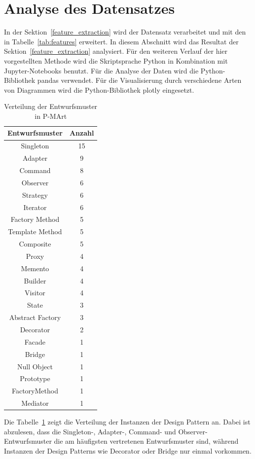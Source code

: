 \section{Analyse des Datensatzes}\label{dataset_analysis}

In der Sektion~\ref{feature_extraction} wird der Datensatz verarbeitet und mit den in Tabelle~\ref{tab:features} erweitert.
In diesem Abschnitt wird das Resultat der Sektion~\ref{feature_extraction} analysiert.
Für den weiteren Verlauf der hier vorgestellten Methode wird die Skriptsprache Python in Kombination mit Jupyter-Notebooks benutzt. Für die Analyse der Daten wird die Python-Bibliothek pandas verwendet. Für die Visualisierung durch verschiedene Arten von Diagrammen wird die Python-Bibliothek plotly eingesetzt.


\begin{table}[h]
    \begin{tabular}{|c|c|}
        \hline
        Entwurfsmuster & Anzahl\\
        \hline
        Singleton&15\\Adapter&9\\Command&8\\Observer&6\\Strategy&6\\Iterator&6\\Factory Method&5\\Template Method&5\\Composite&5\\Proxy&4\\Memento&4\\Builder&4\\Visitor&4\\State&3\\Abstract Factory&3\\Decorator&2\\Facade&1\\Bridge&1\\Null Object&1\\Prototype&1\\FactoryMethod&1\\Mediator&1\\
        \hline
    \end{tabular}
    \caption{Verteilung der Entwurfsmuster in P-MArt}
    \label{tab:dp_dist}
\end{table}



Die Tabelle~\ref{tab:dp_dist} zeigt die Verteilung der Instanzen der Design Pattern an. 
Dabei ist abzulesen, dass die Singleton-, Adapter-, Command- und Observer-Entwurfsmuster die am häufigsten vertretenen Entwurfsmuster sind, während Instanzen der Design Patterns wie Decorator oder Bridge nur einmal vorkommen.


